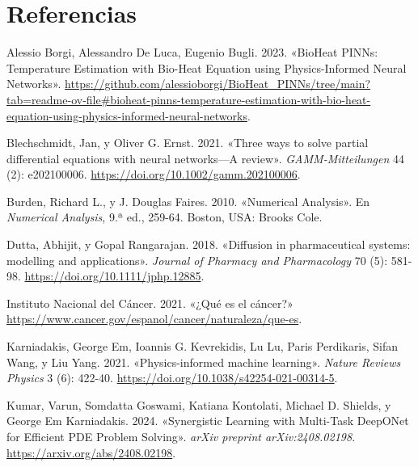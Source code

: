 \documentclass[
  spanish,
  us-letterpaper,
  DIV=11,
  numbers=noendperiod]{scrreprt}
\newlength{\cslhangindent}
\newenvironment{CSLReferences}[2] %
 {\begin{list}{}{%
  \setlength{\itemindent}{0pt}
  \setlength{\leftmargin}{0pt}
  \setlength{\parsep}{0pt}
  \ifodd #1
   \setlength{\leftmargin}{\cslhangindent}
   \setlength{\itemindent}{-1\cslhangindent}
  \fi
  \setlength{\itemsep}{#2\baselineskip}}}
 {\end{list}}
\theoremstyle{plain}
\theoremstyle{definition}
\theoremstyle{remark}
\begin{document}

\chapter*{Referencias}\label{referencias}


\label{refs}
\begin{CSLReferences}{1}{0}
Alessio Borgi, Alessandro De Luca, Eugenio Bugli. 2023. {«{BioHeat
PINNs: Temperature Estimation with Bio-Heat Equation using
Physics-Informed Neural Networks}»}.
\url{https://github.com/alessioborgi/BioHeat_PINNs/tree/main?tab=readme-ov-file\#bioheat-pinns-temperature-estimation-with-bio-heat-equation-using-physics-informed-neural-networks}.

Blechschmidt, Jan, y Oliver G. Ernst. 2021. {«Three ways to solve
partial differential equations with neural networks---A review»}.
\emph{GAMM-Mitteilungen} 44 (2): e202100006.
\url{https://doi.org/10.1002/gamm.202100006}.

Burden, Richard L., y J. Douglas Faires. 2010. {«Numerical Analysis»}.
En \emph{Numerical Analysis}, 9.ª ed., 259-64. Boston, USA: Brooks Cole.

Dutta, Abhijit, y Gopal Rangarajan. 2018. {«Diffusion in pharmaceutical
systems: modelling and applications»}. \emph{Journal of Pharmacy and
Pharmacology} 70 (5): 581-98. \url{https://doi.org/10.1111/jphp.12885}.

Instituto Nacional del Cáncer. 2021. {«{¿Qué es el cáncer?}»}
\url{https://www.cancer.gov/espanol/cancer/naturaleza/que-es}.

Karniadakis, George Em, Ioannis G. Kevrekidis, Lu Lu, Paris Perdikaris,
Sifan Wang, y Liu Yang. 2021. {«Physics-informed machine learning»}.
\emph{Nature Reviews Physics} 3 (6): 422-40.
\url{https://doi.org/10.1038/s42254-021-00314-5}.

Kumar, Varun, Somdatta Goswami, Katiana Kontolati, Michael D. Shields, y
George Em Karniadakis. 2024. {«Synergistic Learning with Multi-Task
DeepONet for Efficient PDE Problem Solving»}. \emph{arXiv preprint
arXiv:2408.02198}. \url{https://arxiv.org/abs/2408.02198}.


\end{CSLReferences}
\end{document}
